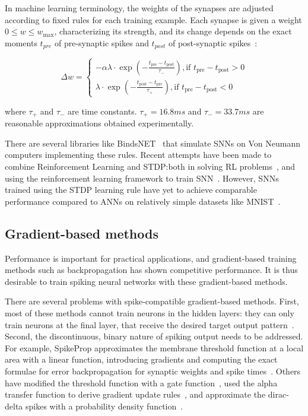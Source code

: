 \documentclass[fyp]{socreport}
\begin{document}
In machine learning terminology, the weights of the synapses are adjusted
according to fixed rules for each training example. Each synapse is given a
weight \(0 \le w \le w_{\max}\), characterizing its strength, and its change
depends on the exact moments \(t_{pre}\) of pre-synaptic spikes and \(t_{post}\)
of post-synaptic spikes~\cite{sboev18_spikin_neural_networ_reinf_learn}:

\begin{equation} \Delta w=\left\{\begin{array}{l}{-\alpha \lambda \cdot \exp \left(-\frac{t_{\mathrm{pre}}-t_{\mathrm{post}}}{\tau_{-}}\right), \text {if } t_{\mathrm{pre}}-t_{\mathrm{post}}>0} \\ {\lambda \cdot \exp \left(-\frac{t_{\mathrm{post}}-t_{\mathrm{pre}}}{\tau_{+}}\right), \text {if } t_{\mathrm{pre}}-t_{\mathrm{post}}<0}\end{array}\right.
\end{equation}

where \(\tau_{+}\) and \(\tau_{-}\) are time constants. \(\tau_{+} = 16.8ms\)
and \(\tau_{-} = 33.7ms\) are reasonable approximations obtained experimentally.

There are several libraries like BindsNET~\cite{10.3389/fninf.2018.00089} that
simulate SNNs on Von Neumann computers implementing these rules. Recent attempts
have been made to combine Reinforcement Learning and STDP:\@ both in solving RL
problems~\cite{10.3389/fninf.2018.00089}, and using the reinforcement learning
framework to train
SNN~\cite{10.3389/fnbot.2019.00018,10.3389/fnins.2018.00435}. However, SNNs
trained using the STDP learning rule have yet to achieve comparable performance
compared to ANNs on relatively simple datasets like MNIST~\cite{TAVANAEI201947}.

\subsection{Gradient-based methods}

Performance is important for practical applications, and gradient-based training
methods such as backpropagation has shown competitive performance. It is thus
desirable to train spiking neural networks with these gradient-based methods.

There are several problems with spike-compatible gradient-based methods. First,
most of these methods cannot train neurons in the hidden layers: they can only
train neurons at the final layer, that receive the desired target output
pattern~\cite{urbanczik09_gradien_learn_rule_tempot,training_deep_snn_bpp_lee}.
Second, the discontinuous, binary nature of spiking output needs to be
addressed. For example, SpikeProp approximates the membrane threshold function
at a local area with a linear function, introducing gradients and computing the
exact formulae for error backpropagation for synaptic weights and spike
times~\cite{spikeprop}. Others have modified the threshold function with a gate
function~\cite{NIPS2018_7417}, used the alpha transfer function to derive
gradient update rules~\cite{comsa19_tempor_codin_spikin_neural_networ}, and
approximate the dirac-delta spikes with a probability density
function~\cite{NIPS2018_7415}.
\end{document}
